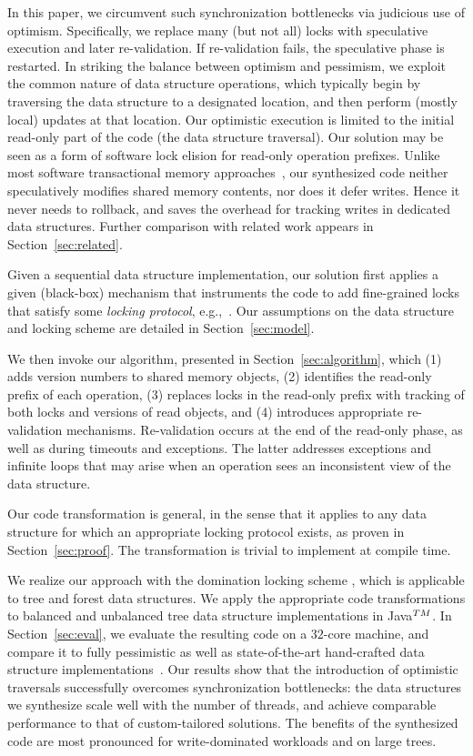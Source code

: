 In this paper, we circumvent such synchronization bottlenecks via judicious use of optimism.
Specifically, we replace many (but not all) locks with speculative execution and later re-validation.
If re-validation fails, the speculative phase is restarted.
In striking the balance between optimism and pessimism, we exploit the common nature of data structure operations,
which typically begin by traversing the data structure to a designated location, and then perform (mostly local) updates at that location.
Our optimistic execution is limited to the initial read-only part of the code
(the data structure traversal). 
Our solution may be seen as a form of software lock elision for read-only operation prefixes.
Unlike most software transactional memory approaches~\cite{HLR:SLCA2010},
our synthesized code neither speculatively modifies shared memory contents, nor does it defer writes.
Hence it never needs to rollback, and saves the overhead for tracking writes in dedicated data structures.
Further comparison with related work appears in Section~\ref{sec:related}.

Given a sequential data structure implementation,
our solution first applies a given (black-box) mechanism that instruments the code to add
fine-grained locks that satisfy some \emph{locking protocol}, e.g.,~\cite{Gueta2011,MZGB:POPL06}.
Our assumptions on the data structure and locking scheme are detailed in Section~\ref{sec:model}.

We then invoke our algorithm, presented in Section~\ref{sec:algorithm}, which
(1) adds version numbers to shared memory objects,
(2) identifies the read-only prefix of each operation,
(3) replaces locks in the read-only prefix with tracking of both locks and versions of read objects, and
(4) introduces appropriate re-validation mechanisms.
Re-validation occurs at the end of the read-only phase, as well as during timeouts and exceptions.
The latter addresses exceptions and infinite loops that may arise when an operation sees an inconsistent view of the data structure.

Our code transformation is general, in the sense that it applies to any data structure for which an appropriate locking protocol exists,
as proven in Section~\ref{sec:proof}. The transformation is trivial to implement at compile time.

We realize our approach with the domination locking scheme \cite{Gueta2011},
which is applicable to tree and forest data structures.
We apply the appropriate code transformations to balanced and unbalanced tree data structure implementations in Java$^{\sc TM}$.
In Section~\ref{sec:eval}, we evaluate the resulting code on a $32$-core machine,
and compare it to fully pessimistic as well as state-of-the-art hand-crafted
data structure implementations~\cite{DrachslerVY2014,BronsonCCO2010}.
Our results show that the introduction of optimistic traversals successfully overcomes synchronization bottlenecks:
the data structures we synthesize scale well with the number of threads,
and achieve comparable performance to that of custom-tailored solutions.
The benefits of the synthesized code are most pronounced for write-dominated workloads and on large trees.

